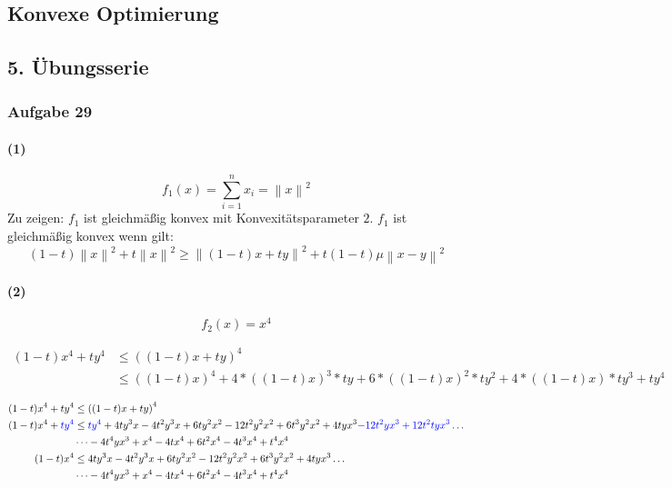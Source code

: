 \documentclass{article}
\newcommand{\norm}[1]{\left\lVert#1\right\rVert}
\begin{document}
\begin{center}
	\section*{Konvexe Optimierung}
	\subsection*{5. Übungsserie}
\end{center}

\subsubsection*{Aufgabe 29}
\paragraph{(1)}
\begin{equation}
f_1(x) = \sum\limits_{i=1}^n x_i = \norm{x}^2
\end{equation}
Zu zeigen: $f_1$ ist gleichmäßig konvex mit Konvexitätsparameter $2$. $f_1$ ist gleichmäßig konvex wenn gilt:
\begin{equation}
(1-t)\norm{x}^2 + t \norm{x}^2 \geq \norm{(1-t)x + ty}^2 + t(1-t)\mu \norm{x -y}^2
\end{equation}

\paragraph{(2)}

\begin{equation}
f_2(x) = x^4
\end{equation}


\begin{align*}
	(1-t)x^4 + ty^4 &\leq \left((1-t)x + ty\right)^4\\
	&\leq \left( (1-t)x \right)^4 + 4*\left( (1-t)x \right)^3*ty + 6*\left( (1-t)x \right)^2*ty^2 + 4*\left( (1-t)x \right)*ty^3 + ty^4
\end{align*}

\begin{align}
(1-t)x^4 + ty^4 &\leq \left((1-t)x + ty\right)^4\\
(1-t)x^4 + \textcolor{blue}{ty^4} &\leq \textcolor{blue}{ty^4}+4ty^3x-4t^2y^3x+6ty^2x^2-12t^2y^2x^2+6t^3y^2x^2+4tyx^3\textcolor{blue}{-12t^2yx^3+12t^2tyx^3}\dots \\
&\dots -4t^4yx^3+x^4-4tx^4+6t^2x^4-4t^3x^4+t^4x^4\\
(1-t)x^4 &\leq 4ty^3x-4t^2y^3x+6ty^2x^2-12t^2y^2x^2+6t^3y^2x^2+4tyx^3\dots \\
&\dots-4t^4yx^3+x^4-4tx^4+6t^2x^4-4t^3x^4+t^4x^4\\
\end{align}
\end{document}
